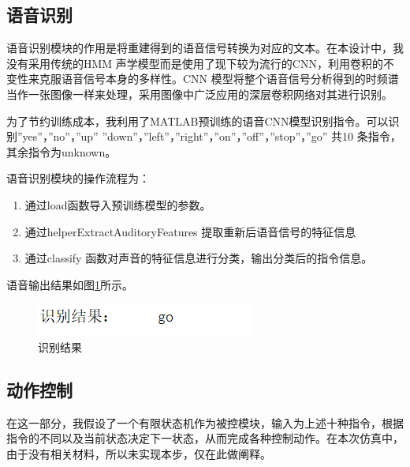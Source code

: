 \documentclass{../source/zju}
\begin{document}
    \subsection{语音识别}
        语音识别模块的作用是将重建得到的语音信号转换为对应的文本。在本设计中，我没有采用传统的HMM 声学模型而是使用了现下较为流行的CNN，利用卷积的不变性来克服语音信号本身的多样性。CNN 模型将整个语音信号分析得到的时频谱当作一张图像一样来处理，采用图像中广泛应用的深层卷积网络对其进行识别。

        为了节约训练成本，我利用了MATLAB预训练的语音CNN模型识别指令。可以识别”yes”，”no”，”up” ”down”，”left”，”right”，”on”，”off”，”stop”，”go” 共10 条指令，其余指令为unknown。

        语音识别模块的操作流程为：
        \begin{enumerate}
            \item 通过load函数导入预训练模型的参数。
            \item 通过helperExtractAuditoryFeatures 提取重新后语音信号的特征信息
            \item 通过classify 函数对声音的特征信息进行分类，输出分类后的指令信息。
        \end{enumerate}
        语音输出结果如图\ref{识别结果}所示。
        \begin{figure}[H]
            \centering
            \includegraphics[]{figure/识别结果.png}
            \caption{识别结果}
            \label{识别结果}
        \end{figure}

    \subsection{动作控制}
        在这一部分，我假设了一个有限状态机作为被控模块，输入为上述十种指令，根据指令的不同以及当前状态决定下一状态，从而完成各种控制动作。在本次仿真中，由于没有相关材料，所以未实现本步，仅在此做阐释。
\end{document}

